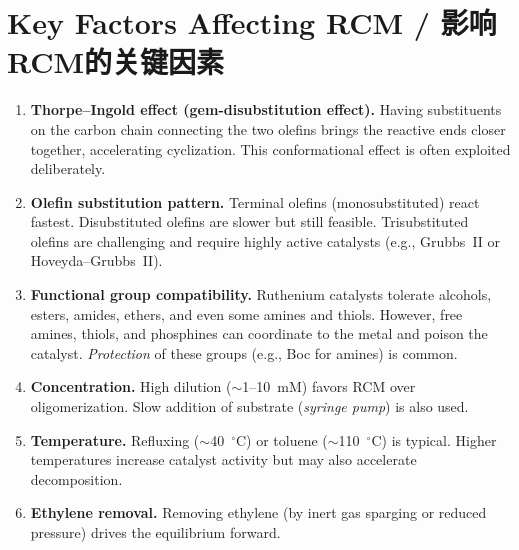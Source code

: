 \documentclass[11pt, a4paper]{article}
\begin{document}
\section{Key Factors Affecting RCM / 影响RCM的关键因素}

\begin{enbox}[English]
\begin{enumerate}[label=\textbf{\arabic*.}]
  \item \textbf{Thorpe--Ingold effect (gem-disubstitution effect).}  Having substituents on the carbon chain connecting the two olefins brings the reactive ends closer together, accelerating cyclization.  This conformational effect is often exploited deliberately.

  \item \textbf{Olefin substitution pattern.}  Terminal olefins (monosubstituted) react fastest.  Disubstituted olefins are slower but still feasible.  Trisubstituted olefins are challenging and require highly active catalysts (e.g., Grubbs~II or Hoveyda--Grubbs~II).

  \item \textbf{Functional group compatibility.}  Ruthenium catalysts tolerate alcohols, esters, amides, ethers, and even some amines and thiols.  However, free amines, thiols, and phosphines can coordinate to the metal and poison the catalyst.  \textit{Protection} of these groups (e.g., Boc for amines) is common.

  \item \textbf{Concentration.}  High dilution ($\sim$1--10~mM) favors RCM over oligomerization.  Slow addition of substrate (\textit{syringe pump}) is also used.

  \item \textbf{Temperature.}  Refluxing  ($\sim$40~$^\circ$C) or toluene ($\sim$110~$^\circ$C) is typical.  Higher temperatures increase catalyst activity but may also accelerate decomposition.

  \item \textbf{Ethylene removal.}  Removing ethylene (by inert gas sparging or reduced pressure) drives the equilibrium forward.
\end{enumerate}
\end{enbox}
\end{document}
